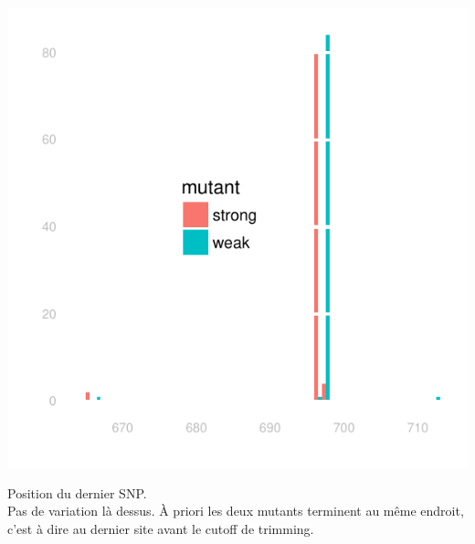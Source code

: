 \documentclass[a4paper]{tufte-handout}
\begin{document}
\begin{marginfigure}
  \includegraphics[width=\linewidth]{../end_switch.pdf}
  \caption{Position du dernier SNP.\\
    Pas de variation là dessus. À priori les deux mutants terminent au même
    endroit, c'est à dire au dernier site avant le cutoff de trimming. 
  }
\end{marginfigure}
\end{document}
